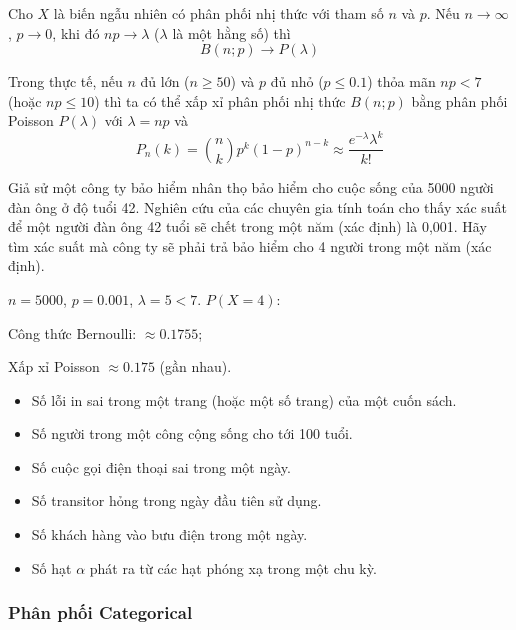 \documentclass[12pt,a4paper]{article}
\begin{document}
\begin{dinhly}[title={Xấp xỉ phân phối nhị thức bằng phân phối Poisson}]
  Cho $X$ là biến ngẫu nhiên có phân phối nhị thức với tham số $n$ và $p$. Nếu $n \rightarrow \infty$, $p \rightarrow 0$, khi đó $np \rightarrow \lambda$ ($\lambda$ là một hằng số) thì
  \[
    B(n; p) \rightarrow P(\lambda)
  \]

  Trong thực tế, nếu $n$ đủ lớn ($n \ge 50$) và $p$ đủ nhỏ ($p \le 0.1$) thỏa mãn $np < 7$ (hoặc $np \le 10$) thì ta có thể xấp xỉ phân phối nhị thức $B(n; p)$ bằng phân phối Poisson $P(\lambda)$ với $\lambda = np$ và
  \[
    P_n(k) = \binom{n}{k} p^k (1 - p)^{n-k} \approx \dfrac{e^{-\lambda}\lambda^k}{k!}
  \]
\end{dinhly}

\begin{vidu}[title={Bảo hiểm 5000 người}]
Giả sử một công ty bảo hiểm nhân thọ bảo hiểm cho cuộc sống của 5000 người đàn ông ở độ tuổi 42. Nghiên cứu của các chuyên gia tính toán cho thấy xác suất để một người đàn ông 42 tuổi sẽ chết trong một năm (xác định) là 0,001. Hãy tìm xác suất mà công ty sẽ phải trả bảo hiểm cho 4 người trong một năm (xác định).

$n = 5000$, $p = 0.001$, $\lambda = 5 < 7$. $P(X = 4)$:

Công thức Bernoulli: $\approx 0.1755$;

Xấp xỉ Poisson $\approx 0.175$ (gần nhau).
\end{vidu}

\begin{ynghia}[title={Ứng dụng}]
  \begin{itemize}
  \item Số lỗi in sai trong một trang (hoặc một số trang) của một cuốn sách.
  \item Số người trong một công cộng sống cho tới 100 tuổi.
  \item Số cuộc gọi điện thoại sai trong một ngày.
  \item Số transitor hỏng trong ngày đầu tiên sử dụng.
  \item Số khách hàng vào bưu điện trong một ngày.
  \item Số hạt $\alpha$ phát ra từ các hạt phóng xạ trong một chu kỳ.
  \end{itemize}
\end{ynghia}

\subsubsection{Phân phối Categorical}
\end{document}
